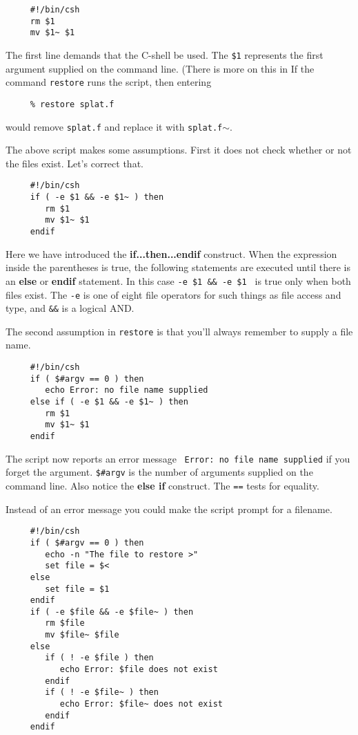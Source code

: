 \small
\begin{verbatim}
     #!/bin/csh
     rm $1
     mv $1~ $1
\end{verbatim}
\normalsize
The first line demands that the C-shell be used.
The {\tt \$1} represents the first argument supplied on the command line.
(There is more on this in 
If the command {\tt restore} runs the script, then entering

\small
\begin{verbatim}
     % restore splat.f
\end{verbatim}
\normalsize
would remove {\tt splat.f} and replace it with {\tt splat.f$\sim$}.

The above script makes some assumptions.  First it does not check
whether or not the files exist.  Let's correct that.

\small
\begin{verbatim}
     #!/bin/csh
     if ( -e $1 && -e $1~ ) then
        rm $1
        mv $1~ $1
     endif
\end{verbatim}
\normalsize

Here we have introduced the {\bf if...then...endif} construct.  When
the expression inside the parentheses is true, the following statements
are executed until there is an {\bf else} or {\bf endif} statement.
In this case {\tt -e \$1 \&\& -e \$1~} is true only when both files exist.
The {\tt -e} is one of eight {\sf file operators} for such things as
file access and type, and {\tt \&\&} is a logical AND.

The second assumption in {\tt restore} is that you'll always remember
to supply a file name.

\small
\begin{verbatim}
     #!/bin/csh
     if ( $#argv == 0 ) then
        echo Error: no file name supplied
     else if ( -e $1 && -e $1~ ) then
        rm $1
        mv $1~ $1
     endif
\end{verbatim}
\normalsize
The script now reports an error message ~\mbox{{\tt Error:~no file name
supplied}} if you forget the argument.  {\tt \$\#argv} is the number of
arguments supplied on the command line.  Also notice the {\bf else if}
construct.  The {\tt ==} tests for equality.

Instead of an error message you could make the script prompt for a
filename.

\small
\begin{verbatim}
     #!/bin/csh
     if ( $#argv == 0 ) then
        echo -n "The file to restore >"
        set file = $<
     else
        set file = $1
     endif
     if ( -e $file && -e $file~ ) then
        rm $file
        mv $file~ $file
     else 
        if ( ! -e $file ) then
           echo Error: $file does not exist
        endif
        if ( ! -e $file~ ) then
           echo Error: $file~ does not exist
        endif
     endif
\end{verbatim}
\normalsize


